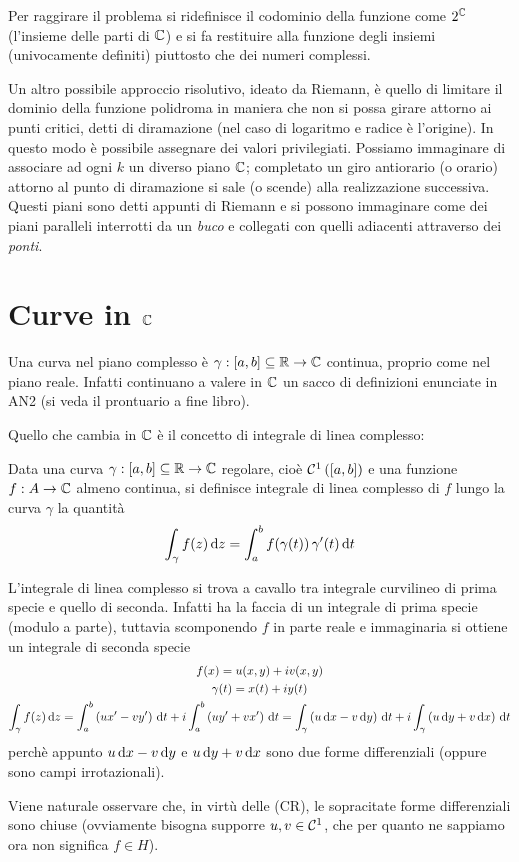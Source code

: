 Per raggirare il problema si ridefinisce il codominio della funzione come $2^{\mathbb{C}}$ (l'insieme delle parti di $\mathbb{C}$) e si fa restituire alla funzione degli insiemi (univocamente definiti) piuttosto che dei numeri complessi. 

Un altro possibile approccio risolutivo, ideato da Riemann, è quello di limitare il dominio della funzione polidroma in maniera che non si possa girare attorno ai punti critici, detti di diramazione (nel caso di logaritmo e radice è l'origine). In questo modo è possibile assegnare dei valori privilegiati. Possiamo immaginare di associare ad ogni $k$ un diverso piano $\mathbb{C}$; completato un giro antiorario (o orario) attorno al punto di diramazione si sale (o scende) alla realizzazione successiva. Questi piani sono detti appunti di Riemann e si possono immaginare come dei piani paralleli interrotti da un \textit{buco} e collegati con quelli adiacenti attraverso dei \textit{ponti}.


\section{Curve in \texorpdfstring{$\mathbb{C}$}{C}}

Una curva nel piano complesso è $\gamma: [a, b]\subseteq\mathbb{R}\rightarrow \mathbb{C}$ continua, proprio come nel piano reale. Infatti continuano a valere in $\mathbb{C}$ un sacco di definizioni enunciate in AN2 (si veda il prontuario a fine libro).

Quello che cambia in $\mathbb{C}$ è il concetto di integrale di linea complesso:
\begin{defn}
Data una curva $\gamma: [a, b]\subseteq\mathbb{R}\rightarrow \mathbb{C}$ regolare, cioè $\mathcal{C}^1\left([a,b]\right)$ e una funzione $f:A\to\mathbb{C}$ almeno continua, si definisce integrale di linea complesso di $f$ lungo la curva $\gamma$ la quantità
\begin{equation*}
\int_{\gamma} f(z) \, \mathrm{d} z = \int^{b}_{a} f(\gamma (t))\, \gamma'(t) \, \mathrm{d} t
\end{equation*}
\end{defn}

\begin{rem}
L'integrale di linea complesso si trova a cavallo tra integrale curvilineo di prima specie e quello di seconda. Infatti ha la faccia di un integrale di prima specie (modulo a parte), tuttavia scomponendo $f$ in parte reale e immaginaria si ottiene un integrale di seconda specie
\begin{gather*}
f(x)=u(x,y)+iv(x,y) \\
\gamma(t)=x(t)+iy(t) \\ 
\int_\gamma f(z)\, \mathrm{d} z=\int_a^b \left(ux'-vy'\right)\, \mathrm{d} t+i\int_a^b\left(uy'+vx'\right) \, \mathrm{d} t = \int_\gamma\left(u\, \mathrm{d} x-v\, \mathrm{d} y\right)\, \mathrm{d} t +i\int_\gamma\left(u\, \mathrm{d} y+v\, \mathrm{d} x\right)\, \mathrm{d} t
\end{gather*}
perchè appunto $u\, \mathrm{d} x-v\, \mathrm{d} y$ e $u\, \mathrm{d} y+v\, \mathrm{d} x$ sono due forme differenziali (oppure sono campi irrotazionali).

Viene naturale osservare che, in virtù delle (CR), le sopracitate forme differenziali sono chiuse (ovviamente bisogna supporre $u,v\in\mathcal{C}^1$, che per quanto ne sappiamo ora non significa $f\in H$). 
\end{rem}

